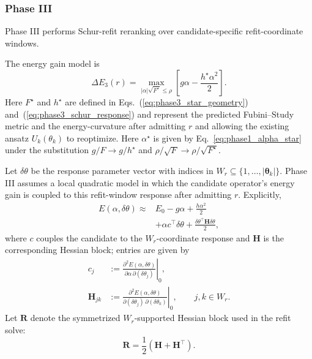 \documentclass[
  reprint,
  amsmath,
  amssymb,
  aps,
  pra,
  nofootinbib,
  superscriptaddress,
  floatfix
]{revtex4-2}
\begin{document}
\subsubsection{Phase III}

Phase III performs Schur-refit reranking over candidate-specific refit-coordinate windows.

The energy gain model is
\begin{equation}
\Delta E_{3}(r)=
\max_{|\alpha|\sqrt{F^\star}\le\rho}
\left[g\alpha-\frac{h^\star \alpha^2}{2}\right].
\label{eq:phase3_gain}
\end{equation}
Here $F^\star$ and $h^\star$ are defined in Eqs.~(\ref{eq:phase3_star_geometry}) and~(\ref{eq:phase3_schur_response}) and represent the predicted Fubini--Study metric and the energy-curvature after admitting $r$ and allowing the existing ansatz $U_k(\theta_k)$ to reoptimize. Here $\alpha^\star$ is given by Eq.~\ref{eq:phase1_alpha_star} under the substitution $g/F \to g/h^\star$ and $\rho / \sqrt{F} \to \rho / \sqrt{F^\star}$.

Let $\delta\theta$ be the response parameter vector with indices in \(W_r\subseteq\{1,\ldots,|\boldsymbol{\theta}_k|\}\). Phase III assumes a local quadratic model in which the candidate operator's energy gain is coupled to this refit-window response after admitting $r$.
Explicitly, 
\begin{equation}
\begin{split}
E(\alpha,\delta\theta)\approx{}&E_0-g\alpha+\frac{h\alpha^2}{2} \\
&+\alpha c^{\top}\delta\theta
+\frac{\delta\theta^{\top}\mathbf{H}\delta\theta}{2},
\end{split}
\label{eq:local_quadratic}
\end{equation}
where $c$ couples the candidate to the \(W_r\)-coordinate response and $\mathbf{H}$ is the corresponding Hessian block; entries are given by
\begin{equation}
\begin{aligned}
c_j&:=
\left.
\frac{\partial^2E(\alpha,\delta\theta)}
{\partial\alpha\,\partial(\delta\theta_j)}
\right|_0,\\
\mathbf{H}_{jk}&:=
\left.
\frac{\partial^2E(\alpha,\delta\theta)}
{\partial(\delta\theta_j)\,\partial(\delta\theta_k)}
\right|_0,
\qquad j,k\in W_r .
\end{aligned}
\label{eq:phase3_window_derivatives}
\end{equation}
Let \(\mathbf R\) denote the symmetrized \(W_r\)-supported Hessian block used in the refit solve:
\begin{equation}
\mathbf R=\frac12(\mathbf H+\mathbf H^{\top}).
\label{eq:phase3_regularized_hessian}
\end{equation}
\end{document}
